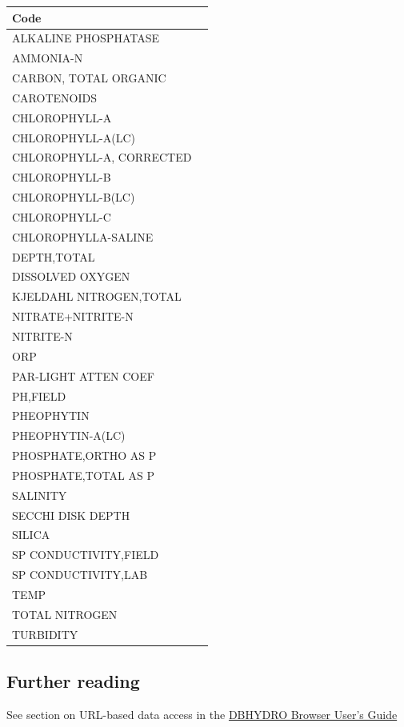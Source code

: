 \documentclass[12pt,notitlepage]{article}
\begin{document}
\begin{longtable}{| p{} | p{} |} 
\hline
Code\\
\hline
ALKALINE PHOSPHATASE\\
AMMONIA-N\\
CARBON, TOTAL ORGANIC\\
CAROTENOIDS\\
CHLOROPHYLL-A\\
CHLOROPHYLL-A(LC)\\
CHLOROPHYLL-A, CORRECTED\\
CHLOROPHYLL-B\\
CHLOROPHYLL-B(LC)\\
CHLOROPHYLL-C\\
CHLOROPHYLLA-SALINE\\
DEPTH,TOTAL\\
DISSOLVED OXYGEN\\
KJELDAHL NITROGEN,TOTAL\\
NITRATE+NITRITE-N\\
NITRITE-N\\
ORP\\
PAR-LIGHT ATTEN COEF\\
PH,FIELD\\
PHEOPHYTIN\\
PHEOPHYTIN-A(LC)\\
PHOSPHATE,ORTHO AS P\\
PHOSPHATE,TOTAL AS P\\
SALINITY\\
SECCHI DISK DEPTH\\
SILICA\\
SP CONDUCTIVITY,FIELD\\
SP CONDUCTIVITY,LAB\\
TEMP\\
TOTAL NITROGEN\\
TURBIDITY\\
\hline
\end{longtable}

\subsection{Further reading}
See section on URL-based data access in the \href{http://www.sfwmd.gov/portal/page/portal/xrepository/sfwmd_repository_pdf/dbhydrobrowseruserdocumentation.pdf}{DBHYDRO Browser User's Guide}

\medskip
 


 
\end{document}
